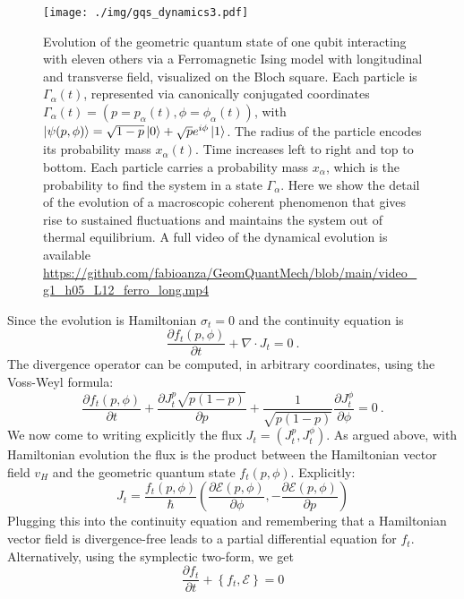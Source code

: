 \documentclass[%
 reprint,
 superscriptaddress,
 aps,
 pra,
]{revtex4-2}
\newcommand{\p}{\partial}
\theoremstyle{definition}
\begin{document}
\begin{figure*}[t!]
\centering
\texttt{[image: ./img/gqs\_dynamics3.pdf]}
\caption{Evolution of the geometric quantum state of one qubit interacting with 
	eleven others via a Ferromagnetic Ising model with longitudinal and transverse field, 
	visualized on the Bloch square. Each particle is $\Gamma_\alpha(t)$, represented via
	canonically conjugated coordinates $\Gamma_\alpha(t) = \left( p=p_\alpha(t),\phi=\phi_\alpha(t)\right)$, with $\ket{\psi(p,\phi)} = 
	\sqrt{1-p} \ket{0}+ \sqrt{p} e^{i\phi}\ket{1}$. The radius of the particle encodes its 
	probability mass $x_\alpha(t)$. Time increases left to right and top to bottom. Each particle
	carries a probability mass $x_\alpha$, which is the probability to find the system in a 
	state $\Gamma_\alpha$. Here we show the detail of the evolution of a macroscopic 
	coherent phenomenon that gives rise to sustained fluctuations and maintains the
	system out of thermal equilibrium. A full video of the dynamical evolution is available 
	\url{https://github.com/fabioanza/GeomQuantMech/blob/main/video_g1_h05_L12_ferro_long.mp4}
	}
\label{fig:gqs_dynamics3}
\end{figure*}
Since the evolution is Hamiltonian $\sigma_t=0$ and the continuity equation is 
\begin{equation}
\frac{\partial f_t(p,\phi)}{\partial t} + \nabla \cdot J_t = 0~.
\end{equation}
The divergence operator can be computed, in arbitrary coordinates, using the Voss-Weyl formula: 
\begin{equation}
\frac{\partial f_t(p,\phi)}{\partial t} + \frac{\partial J_t^p \sqrt{p(1-p)}}{\partial p} + \frac{1}{\sqrt{p(1-p)}}\frac{\partial J_t^{\phi}}{\partial \phi} = 0~.
\end{equation}
We now come to writing explicitly the flux $J_t = (J_t^p,J_t^{\phi})$. As argued above, 
with Hamiltonian evolution the flux is the product between the Hamiltonian vector 
field $v_H$ and the geometric quantum state $f_t(p,\phi)$. Explicitly:
\begin{equation}
J_t =  \frac{f_t(p,\phi)}{\hbar} \left(\frac{\p \mathcal{E}(p,\phi)}{\p \phi}, -\frac{\p \mathcal{E}(p,\phi)}{\p p}\right)
\end{equation}
Plugging this into the continuity equation and remembering that a Hamiltonian vector field is 
divergence-free leads to a partial differential equation for $f_t$. Alternatively, using the symplectic two-form, we get
\begin{equation}
\frac{\partial f_t}{\partial t} + \left\{ f_t, \mathcal{E}\right\} = 0
\end{equation}
\end{document}
